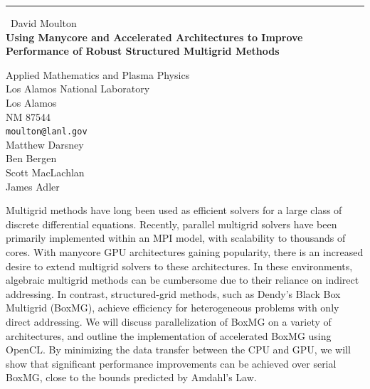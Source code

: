 \documentclass{report}
\begin{document}
\begin{center}
\rule{6in}{1pt} \
{\large David Moulton \\
{\bf Using Manycore and Accelerated Architectures to Improve Performance of Robust Structured Multigrid Methods}}

Applied Mathematics and Plasma Physics \\ Los Alamos National Laboratory \\ Los Alamos \\ NM 87544
\\
{\tt moulton@lanl.gov}\\
Matthew Darsney\\
Ben Bergen\\
Scott MacLachlan\\
James Adler\end{center}

Multigrid methods have long been used as efficient solvers for a large
class of discrete differential equations. Recently, parallel multigrid
solvers have been primarily implemented within an MPI model, with
scalability to thousands of cores. With manycore GPU architectures
gaining popularity, there is an increased desire to extend multigrid
solvers to these architectures. In these environments, algebraic
multigrid methods can be cumbersome due to their reliance on indirect
addressing. In contrast, structured-grid methods, such as Dendy's Black
Box Multigrid (BoxMG), achieve efficiency for heterogeneous problems with
only direct addressing. We will discuss parallelization of BoxMG on a
variety of architectures, and outline the implementation of accelerated
BoxMG using OpenCL. By minimizing the data transfer between the CPU and
GPU, we will show that significant performance improvements can be
achieved over serial BoxMG, close to the bounds predicted by Amdahl's
Law.
\end{document}
